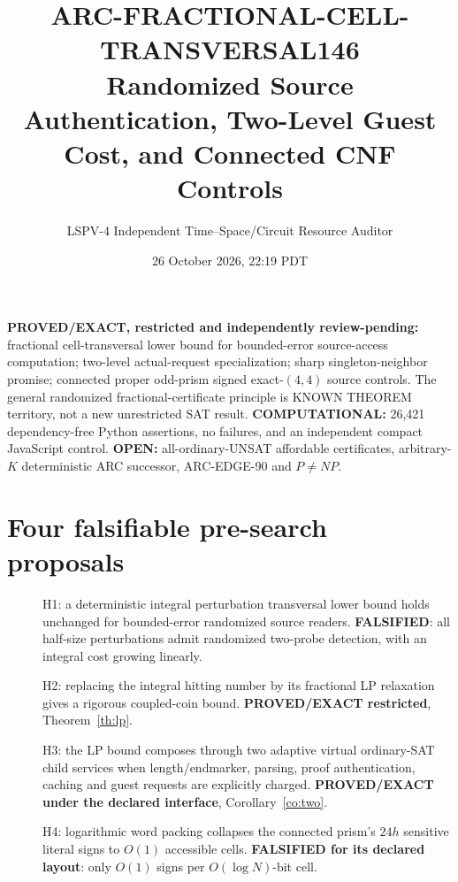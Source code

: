 \documentclass[11pt]{article}
\title{ARC-FRACTIONAL-CELL-TRANSVERSAL146\\\large Randomized Source Authentication, Two-Level Guest Cost, and Connected CNF Controls}
\author{LSPV-4 Independent Time--Space/Circuit Resource Auditor}
\date{26 October 2026, 22:19 PDT}
\begin{document}
\maketitle
\noindent\textbf{PROVED/EXACT, restricted and independently review-pending:} fractional cell-transversal lower bound for bounded-error source-access computation; two-level actual-request specialization; sharp singleton-neighbor promise; connected proper odd-prism signed exact-$(4,4)$ source controls. The general randomized fractional-certificate principle is KNOWN THEOREM territory, not a new unrestricted SAT result. \textbf{COMPUTATIONAL:} 26,421 dependency-free Python assertions, no failures, and an independent compact JavaScript control. \textbf{OPEN:} all-ordinary-UNSAT affordable certificates, arbitrary-$K$ deterministic ARC successor, ARC-EDGE-90 and $P\ne NP$.

\section{Four falsifiable pre-search proposals}
\begin{description}
\item[] H1: a deterministic integral perturbation transversal lower bound holds unchanged for bounded-error randomized source readers. \textbf{FALSIFIED}: all half-size perturbations admit randomized two-probe detection, with an integral cost growing linearly.
\item[] H2: replacing the integral hitting number by its fractional LP relaxation gives a rigorous coupled-coin bound. \textbf{PROVED/EXACT restricted}, Theorem~\ref{th:lp}.
\item[] H3: the LP bound composes through two adaptive virtual ordinary-SAT child services when length/endmarker, parsing, proof authentication, caching and guest requests are explicitly charged. \textbf{PROVED/EXACT under the declared interface}, Corollary~\ref{co:two}.
\item[] H4: logarithmic word packing collapses the connected prism's $24h$ sensitive literal signs to $O(1)$ accessible cells. \textbf{FALSIFIED for its declared layout}: only $O(1)$ signs per $O(\log N)$-bit cell.
\end{description}
\end{document}
